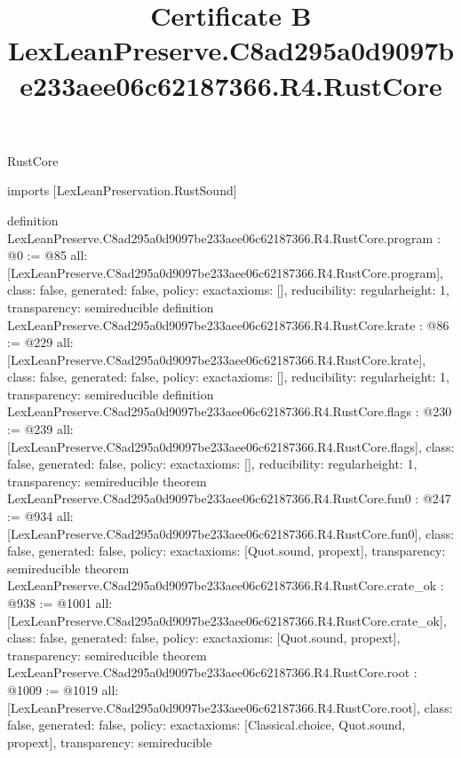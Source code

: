 \begin{lexlean}{RustCore}
\title{Certificate B LexLeanPreserve.C8ad295a0d9097be233aee06c62187366.R4.RustCore}
\begin{coremodule}
imports [LexLeanPreservation.RustSound]

definition LexLeanPreserve.C8ad295a0d9097be233aee06c62187366.R4.RustCore.program : @0 := @85 {
  all: [LexLeanPreserve.C8ad295a0d9097be233aee06c62187366.R4.RustCore.program],
  class: false,
  generated: false,
  policy: exact{axioms: []},
  reducibility: regular{height: 1},
  transparency: semireducible
}
definition LexLeanPreserve.C8ad295a0d9097be233aee06c62187366.R4.RustCore.krate : @86 := @229 {
  all: [LexLeanPreserve.C8ad295a0d9097be233aee06c62187366.R4.RustCore.krate],
  class: false,
  generated: false,
  policy: exact{axioms: []},
  reducibility: regular{height: 1},
  transparency: semireducible
}
definition LexLeanPreserve.C8ad295a0d9097be233aee06c62187366.R4.RustCore.flags : @230 := @239 {
  all: [LexLeanPreserve.C8ad295a0d9097be233aee06c62187366.R4.RustCore.flags],
  class: false,
  generated: false,
  policy: exact{axioms: []},
  reducibility: regular{height: 1},
  transparency: semireducible
}
theorem LexLeanPreserve.C8ad295a0d9097be233aee06c62187366.R4.RustCore.fun0 : @247 := @934 {
  all: [LexLeanPreserve.C8ad295a0d9097be233aee06c62187366.R4.RustCore.fun0],
  class: false,
  generated: false,
  policy: exact{axioms: [Quot.sound, propext]},
  transparency: semireducible
}
theorem LexLeanPreserve.C8ad295a0d9097be233aee06c62187366.R4.RustCore.crate_ok : @938 := @1001 {
  all: [LexLeanPreserve.C8ad295a0d9097be233aee06c62187366.R4.RustCore.crate_ok],
  class: false,
  generated: false,
  policy: exact{axioms: [Quot.sound, propext]},
  transparency: semireducible
}
theorem LexLeanPreserve.C8ad295a0d9097be233aee06c62187366.R4.RustCore.root : @1009 := @1019 {
  all: [LexLeanPreserve.C8ad295a0d9097be233aee06c62187366.R4.RustCore.root],
  class: false,
  generated: false,
  policy: exact{axioms: [Classical.choice, Quot.sound, propext]},
  transparency: semireducible
}


\end{coremodule}
\end{lexlean}
